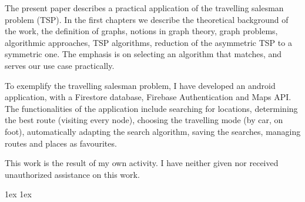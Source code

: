 \documentclass[final]{ubb_dolgozat}
\author{%
Lorenzovici Zsombor
}
\begin{document}
\begin{abstractEN} %


The present paper describes a practical application of the travelling salesman problem (TSP). In the first chapters we describe the theoretical background of the work, the definition of graphs, notions in graph theory, graph problems, algorithmic approaches, TSP algorithms, reduction of the asymmetric TSP to a symmetric one. The emphasis is on selecting an algorithm that matches, and serves our use case practically.

To exemplify the travelling salesman problem, I have developed an android application, with a Firestore database, Firebase Authentication and Maps API. The functionalities of the application include searching for locations, determining the best route (visiting every node), choosing the travelling mode (by car, on foot), automatically adapting the search algorithm, saving the searches, managing routes and places as favourites.

This work is the result of my own activity. I have neither given nor received unauthorized assistance on this work.

\end{abstractEN}

\maketitle


{ \baselineskip 1ex
  \parskip 1ex
  \tableofcontents
}









%



%










{ \renewcommand{\baselinestretch}{0.8}\normalsize %
	\setlength{\itemsep}{-2.4mm}
	\setlength{\bibspacing}{0.67\baselineskip}
	
	
}
\end{document}
